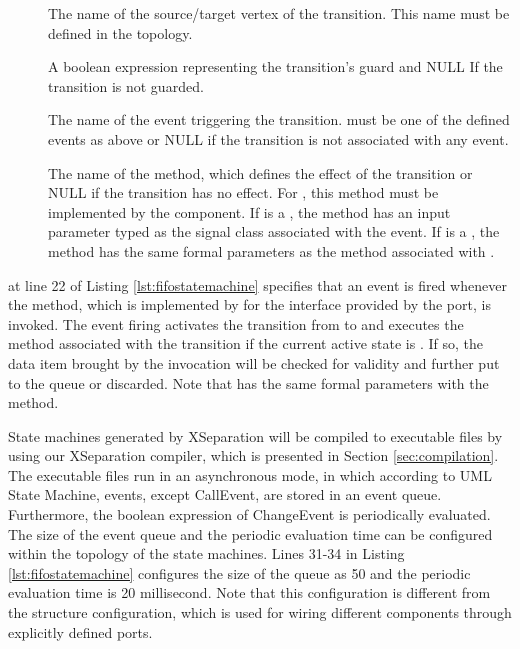 \begin{description}
	\item[] The name of the source/target vertex of the transition. 
	This name must be defined in the topology.
	
	
	\item[] A boolean expression representing the transition's guard and NULL If the transition is not guarded.
	
	\item[] The name of the event triggering the transition. 
	 must be one of the defined events as above or NULL if the transition is not associated with any event.
	
	\item[] The name of the method, which defines the effect of the transition or NULL if the transition has no effect.
	For , this method must be implemented by the component.
	If  is a , the method has an input parameter typed as the signal class associated with the event.
	If  is a , the method has the same formal parameters as the method associated with .
\end{description}


  at line 22 of Listing \ref{lst:fifostatemachine} specifies that an event is fired whenever the  method, which is implemented by  for the  interface provided by the  port, is invoked.
The event firing activates the transition from  to  and executes the  method associated with the transition if the current active state is .
If so, the data item brought by the invocation will be checked for validity and further put to the queue or discarded.
Note that  has the same formal parameters with the  method.

State machines generated by XSeparation will be compiled to executable files by using our XSeparation compiler, which is presented in Section \ref{sec:compilation}.
The executable files run in an asynchronous mode, in which according to UML State Machine, events, except CallEvent, are stored in an event queue.
Furthermore, the boolean expression of ChangeEvent is periodically evaluated.
The size of the event queue and the periodic evaluation time can be configured within the topology of the state machines.
Lines 31-34 in Listing \ref{lst:fifostatemachine} configures the size of the queue as 50 and the periodic evaluation time is 20 millisecond.
Note that this configuration is different from the structure configuration, which is used for wiring different components through explicitly defined ports.

